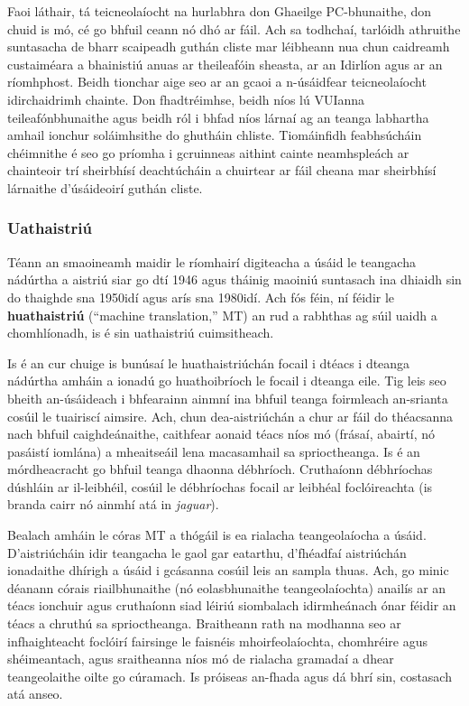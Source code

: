 \begin{multicols}{2}
Faoi láthair, tá teicneolaíocht na hurlabhra don Ghaeilge PC-bhunaithe, don chuid is mó, cé go bhfuil ceann nó dhó ar fáil. Ach sa todhchaí, tarlóidh athruithe suntasacha de bharr scaipeadh guthán cliste mar léibheann nua chun caidreamh custaiméara a bhainistiú anuas ar theileafóin sheasta, ar an Idirlíon agus ar an ríomhphost. Beidh tionchar aige seo ar an gcaoi a n-úsáidfear teicneolaíocht idirchaidrimh chainte. Don fhadtréimhse, beidh níos lú VUIanna teileafónbhunaithe agus beidh ról i bhfad níos lárnaí ag an teanga labhartha amhail ionchur soláimhsithe do ghutháin chliste. Tiomáinfidh feabhsúcháin chéimnithe é seo go príomha i gcruinneas aithint cainte neamhspleách ar chainteoir trí sheirbhísí deachtúcháin a chuirtear ar fáil cheana mar sheirbhísí lárnaithe d’úsáideoirí guthán cliste.


\subsubsection{Uathaistriú}

Téann an smaoineamh maidir le ríomhairí digiteacha a úsáid le teangacha nádúrtha a aistriú siar go dtí 1946 agus tháinig maoiniú suntasach ina dhiaidh sin do thaighde sna 1950idí agus arís sna 1980idí. Ach fós féin, ní féidir le \textbf{huathaistriú} (``machine translation,'' MT) an rud a rabhthas ag súil uaidh a chomhlíonadh, is é sin uathaistriú cuimsitheach. 


Is é an cur chuige is bunúsaí le huathaistriúchán focail i dtéacs i dteanga nádúrtha amháin a ionadú go huathoibríoch le focail i dteanga eile. Tig leis seo bheith an-úsáideach i bhfearainn ainmní ina bhfuil teanga foirmleach an-srianta cosúil le tuairiscí aimsire. Ach, chun dea-aistriúchán a chur ar fáil do théacsanna nach bhfuil caighdeánaithe, caithfear aonaid téacs níos mó (frásaí, abairtí, nó pasáistí iomlána) a mheaitseáil lena macasamhail sa sprioctheanga. Is é an mórdheacracht go bhfuil teanga dhaonna débhríoch. Cruthaíonn débhríochas dúshláin ar il-leibhéil, cosúil le débhríochas focail ar leibhéal foclóireachta (is branda cairr nó ainmhí atá in \textit{jaguar}).

Bealach amháin le córas MT a thógáil is ea rialacha teangeolaíocha a úsáid. D’aistriúcháin idir teangacha le gaol gar eatarthu, d’fhéadfaí aistriúchán ionadaithe dhírigh a úsáid i gcásanna cosúil leis an sampla thuas. Ach, go minic déanann córais riailbhunaithe (nó eolasbhunaithe teangeolaíochta) anailís ar an téacs ionchuir agus cruthaíonn siad léiriú siombalach idirmheánach ónar féidir an téacs a chruthú sa sprioctheanga. Braitheann rath na modhanna seo ar infhaighteacht foclóirí fairsinge le faisnéis mhoirfeolaíochta, chomhréire agus shéimeantach, agus sraitheanna níos mó de rialacha gramadaí a dhear teangeolaithe oilte go cúramach. Is próiseas an-fhada agus dá bhrí sin, costasach atá anseo.


\end{multicols}
